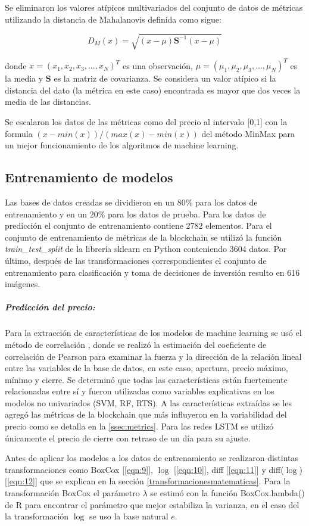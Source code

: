 Se eliminaron los valores atípicos multivariados del conjunto de datos de métricas utilizando la distancia de  Mahalanovis definida como sigue:

\[ D_M(x) = \sqrt{(x-\mu)\textbf{S}^{-1}(x-\mu)} \]

donde $x = (x_1,x_2,x_3,...,x_N)^T$ es una observación, $\mu = (\mu_1,\mu_2,\mu_3,...,\mu_N)^T$ es la media y $\textbf{S}$ es la matriz de covarianza. Se considera un valor atípico si la distancia del dato (la métrica en este caso) encontrada es mayor que dos veces la media de las distancias.

Se escalaron los datos de las métricas como del precio al intervalo [0,1] con la formula $(x-min(x))/(max(x)-min(x))$ del método MinMax para un mejor funcionamiento de los algoritmos de machine learning. 	 

\subsection{Entrenamiento de modelos}

Las bases de datos creadas se dividieron en un 80\% para los datos de entrenamiento y en un 20\% para los datos de prueba. Para los datos de predicción el conjunto de entrenamiento contiene 2782 elementos. Para el conjunto de entrenamiento de métricas de la blockchain se utilizó la función \emph{train\_test\_split} de la librería sklearn en Python conteniendo 3604 datos. Por último, después de las transformaciones correspondientes el conjunto de entrenamiento para clasificación y toma de decisiones de inversión resulto en 616 imágenes.

\subparagraph{Predicción del precio:} Para la extracción de características de los modelos de machine learning se usó el método de correlación \cite{tandonBitcoinPriceForecasting2019}, donde se realizó la estimación del coeficiente de correlación de Pearson para examinar la fuerza y la dirección de la relación lineal entre las variables de la base de datos, en este caso, apertura, precio máximo, mínimo y cierre. Se determinó que todas las características están fuertemente relacionadas entre sí y fueron utilizadas como variables explicativas en los modelos no univariados (SVM, RF, RTS). A las características extraídas se les agregó las métricas de la blockchain que más influyeron en la variabilidad del precio como se detalla en la \autoref{ssec:metrics}.    
Para las redes LSTM se utilizó únicamente el precio de cierre con retraso de un día para su ajuste.

Antes de aplicar los modelos a los datos de entrenamiento se realizaron distintas transformaciones como BoxCox [\ref{eqn:9}], $\log$ [\ref{eqn:10}], diff [\ref{eqn:11}] y diff($\log$) [\ref{eqn:12}] que se explican en la sección \autoref{transformacionesmatematicas}. Para la transformación BoxCox el parámetro $\lambda$ se estimó con la función BoxCox.lambda() de R para encontrar el parámetro que mejor estabiliza la varianza, en el caso del la transformación $\log$ se uso la base natural $e$.

